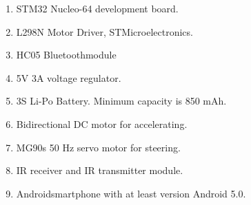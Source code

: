 \begin{enumerate}
    \item STM32 Nucleo-64 development board.
    \item L298N Motor Driver, STMicroelectronics\texttrademark.
    \item HC05 Bluetooth\texttrademark\;module
    \item 5V 3A voltage regulator.
    \item 3S Li-Po Battery. Minimum capacity is 850 mAh.
    \item Bidirectional DC motor for accelerating.
    \item MG90s 50 Hz servo motor for steering. 
    \item IR receiver and IR transmitter module.
    \item Android\texttrademark\;smartphone with at least version Android 5.0.
\end{enumerate}
